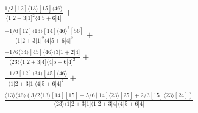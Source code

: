 \documentclass[varwidth, border=5pt]{standalone}
\begin{document}
\begin{my}
$\begin{gathered}
\scriptscriptstyle\frac{1/3[12]⟨13⟩[15]⟨46⟩}{⟨1|2+3|1]^2⟨4|5+6|4]}+\\
\scriptscriptstyle\frac{-1/6[12]⟨13⟩[14]⟨46⟩^2[56]}{⟨1|2+3|1]^2⟨4|5+6|4]^2}+\\
\scriptscriptstyle\frac{-1/6⟨34⟩[45]⟨46⟩⟨3|1+2|4]}{⟨23⟩⟨1|2+3|4]⟨4|5+6|4]^2}+\\
\scriptscriptstyle\frac{-1/2[12]⟨34⟩[45]⟨46⟩}{⟨1|2+3|1]⟨4|5+6|4]^2}+\\
\scriptscriptstyle\frac{⟨13⟩⟨46⟩(3/2⟨13⟩[14][15]+5/6[14]⟨23⟩[25]+2/3[15]⟨23⟩[24])}{⟨23⟩⟨1|2+3|1]⟨1|2+3|4]⟨4|5+6|4]}\phantom{+}
\end{gathered}$
\end{my}
\end{document}
